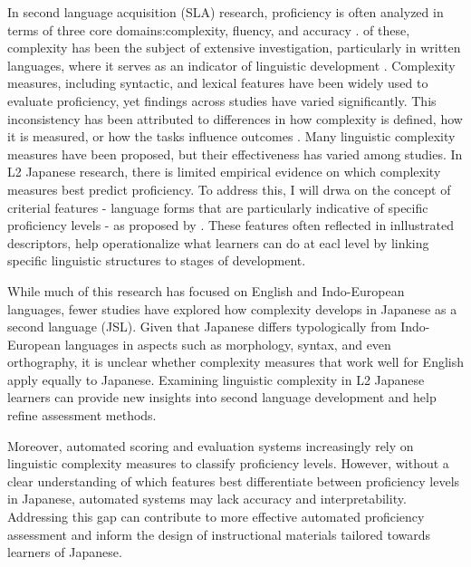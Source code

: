 In second language acquisition (SLA) research, proficiency is often analyzed in terms of three core
domains:complexity, fluency, and accuracy \cite{Skehan1989}. of these, complexity has been the subject of extensive
investigation, particularly in written languages, where it serves as an indicator of linguistic development
\cite{Lu2010, Lu2011, Ortega2003, Iwashita2006}. Complexity measures, including syntactic, and lexical features have
been widely used to evaluate proficiency, yet findings across studies have varied significantly. This inconsistency
has been attributed to differences in how complexity is defined, how it is measured, or how the tasks influence
outcomes \cite{Butle2012}. Many linguistic complexity measures have been proposed, but their effectiveness has
varied among studies. In L2 Japanese research, there is limited empirical evidence on which complexity measures best
predict proficiency.  To address this, I will drwa on the concept of criterial features - language forms that are
particularly indicative of specific proficiency levels - as proposed by \cite{Hawkins_Buttery_2010}. These features
often reflected in inllustrated descriptors, help operationalize what learners can do at eacl level by linking
specific linguistic structures to stages of development.

While much of this research has focused on English and Indo-European languages, fewer studies have explored how
complexity develops in Japanese as a second language (JSL). Given that Japanese differs typologically from
Indo-European languages in aspects such as morphology, syntax, and even orthography, it is unclear whether
complexity measures that work well for English apply equally to Japanese. Examining linguistic complexity in L2
Japanese learners can provide new insights into second language development and help refine assessment methods.

Moreover, automated scoring and evaluation systems increasingly rely on linguistic complexity measures to classify
proficiency levels. However, without a clear understanding of which features best differentiate between
proficiency levels in Japanese, automated systems may lack accuracy and interpretability. Addressing this gap can
contribute to more effective automated proficiency assessment and inform the design of instructional materials
tailored towards learners of Japanese.

